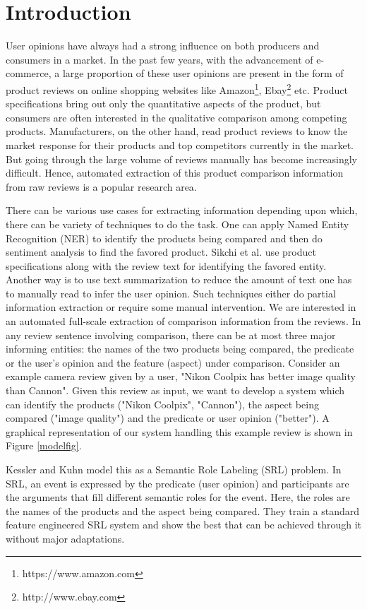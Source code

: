 \section{Introduction}
User opinions have always had a strong influence on both producers and consumers in a market. In the past few years, with the advancement of e-commerce, a large proportion of these user opinions are present in the form of product reviews on online shopping websites like Amazon\footnote{https://www.amazon.com}, Ebay\footnote{http://www.ebay.com} etc. Product specifications bring out only the quantitative aspects of the product, but consumers are often interested in the qualitative comparison among competing products. Manufacturers, on the other hand, read product reviews to know the market response for their products and top competitors currently in the market. But going through the large volume of reviews manually has become increasingly difficult. Hence, automated extraction of this product comparison information from raw reviews is a popular research area.

There can be various use cases for extracting information depending upon which, there can be variety of techniques to do the task. One can apply Named Entity Recognition (NER) to identify the products being compared and then do sentiment analysis to find the favored product. Sikchi et al. \cite{sikchi2016peq} use product specifications along with the review text for identifying the favored entity. Another way is to use text summarization to reduce the amount of text one has to manually read to infer the user opinion. Such techniques either do partial information extraction or require some manual intervention. We are interested in an automated full-scale extraction of comparison information from the reviews. In any review sentence involving comparison, there can be at most three major informing entities: the names of the two products being compared, the predicate or the user's opinion and the feature (aspect) under comparison. Consider an example camera review given by a user, "Nikon Coolpix has better image quality than Cannon". Given this review as input, we want to develop a system which can identify the products ("Nikon Coolpix", "Cannon"), the aspect being compared ("image quality") and the predicate or user opinion ("better"). A graphical representation of our system handling this example review is shown in Figure \ref{modelfig}.

Kessler and Kuhn \cite{kessler2013detection} model this as a Semantic Role Labeling (SRL) problem. In SRL, an event is expressed by the predicate (user opinion) and participants are the arguments that fill different semantic roles for the event. Here, the roles are the names of the products and the aspect being compared. They train a standard feature engineered SRL system \cite{bjorkelund2009multilingual} and show the best that can be achieved through it without  major adaptations.

